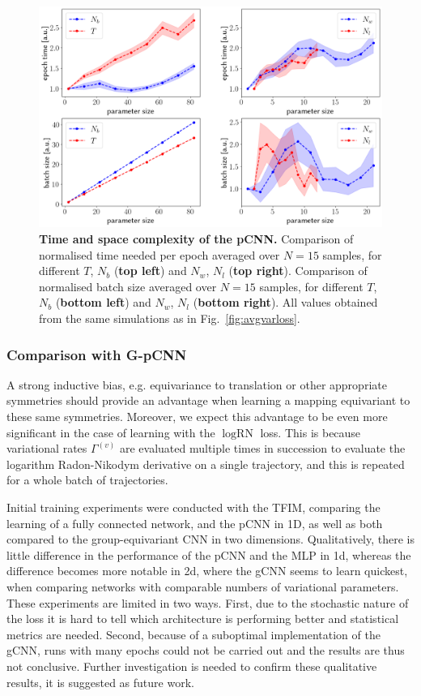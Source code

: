 \begin{figure}[H]
	\centering
	\includegraphics[width=\linewidth]{Chapter5/Figs/Raster/initial_time_space}
	\caption[Time and space complexity of the pCNN]{\textbf{Time and space complexity of the pCNN.} Comparison of normalised time needed per epoch averaged over $N=15$ samples, for different $T$, $N_b$ (\textbf{top left}) and $N_w$, $N_l$ (\textbf{top right}). Comparison of normalised batch size averaged over $N=15$ samples, for different $T$, $N_b$ (\textbf{bottom left}) and $N_w$, $N_l$ (\textbf{bottom right}). All values obtained from the same simulations as in Fig.~\ref{fig:avgvarloss}.}
	\label{fig:initialtimespace}
\end{figure}

\subsubsection{Comparison with G-pCNN}
A strong inductive bias, e.g. equivariance to translation or other appropriate symmetries should provide an advantage when learning a mapping equivariant to these same symmetries. Moreover, we expect this advantage to be even more significant in the case of learning with the $\log \text{RN}$ loss. This is because variational rates $\Gamma^{(v)}$ are evaluated multiple times in succession to evaluate the logarithm Radon-Nikodym derivative on a single trajectory, and this is repeated for a whole batch of trajectories.  

Initial training experiments were conducted with the TFIM, comparing the learning of a fully connected network, and the pCNN in 1D, as well as both compared to the group-equivariant CNN in two dimensions. Qualitatively, there is little difference in the performance of the pCNN and the MLP in 1d, whereas the difference becomes more notable in 2d, where the gCNN seems to learn quickest, when comparing networks with comparable numbers of variational parameters. These experiments are limited in two ways. First, due to the stochastic nature of the loss it is hard to tell which architecture is performing better and statistical metrics are needed. Second, because of a suboptimal implementation of the gCNN, runs with many epochs could not be carried out and the results are thus not conclusive. Further investigation is needed to confirm these qualitative results, it is suggested as future work. 

